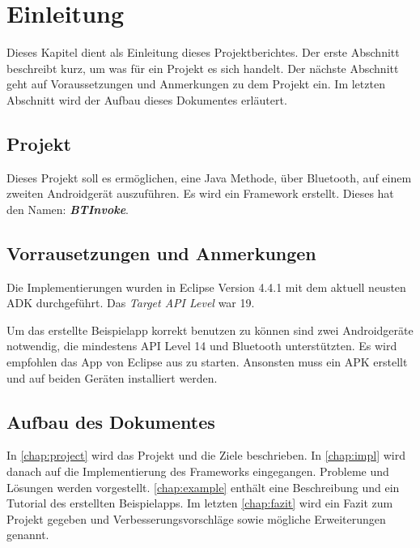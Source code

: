 \chapter{Einleitung}
%
Dieses Kapitel dient als Einleitung dieses Projektberichtes. Der erste Abschnitt beschreibt kurz, um was für ein Projekt es sich handelt. Der nächste Abschnitt geht auf Voraussetzungen und Anmerkungen zu dem Projekt ein. Im letzten Abschnitt wird der Aufbau dieses Dokumentes erläutert.
\section{Projekt}
%
Dieses Projekt soll es ermöglichen, eine Java Methode, über Bluetooth, auf einem zweiten Androidgerät auszuführen. Es wird ein Framework erstellt. Dieses hat den Namen: \mbox{\emph{\textbf{BTInvoke}}}.
%
\section{Vorrausetzungen und Anmerkungen}
%
Die Implementierungen wurden in Eclipse Version 4.4.1 mit dem aktuell neusten ADK durchgeführt. Das \emph{Target API Level} war 19.

Um das erstellte Beispielapp korrekt benutzen zu können sind zwei Androidgeräte notwendig, die mindestens API Level 14 und Bluetooth unterstützten. Es wird empfohlen das App von Eclipse aus zu starten. Ansonsten muss ein APK erstellt und auf beiden Geräten installiert werden.
%
\section{Aufbau des Dokumentes}
%
In \autoref{chap:project} wird das Projekt und die Ziele beschrieben. In \autoref{chap:impl} wird danach auf die Implementierung des Frameworks eingegangen. Probleme und Lösungen werden vorgestellt. \autoref{chap:example} enthält eine Beschreibung und ein Tutorial des erstellten Beispielapps. Im letzten \autoref{chap:fazit} wird ein Fazit zum Projekt gegeben und Verbesserungsvorschläge sowie mögliche Erweiterungen genannt.
%
%
